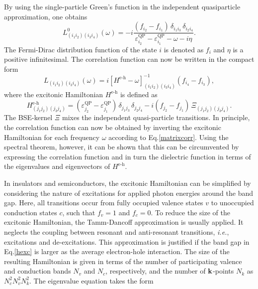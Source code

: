 %
By using the single-particle Green's function in the independent quasiparticle approximation, one obtains
%
\begin{equation}
     L^0_{(i_1i_2)(i_3i_4)}(\omega) = -i\frac{(f_{i_2} - f_{i_1})\,\delta_{i_1i_3}\,\delta_{i_2i_4}}{\varepsilon^\text{QP}_{i_2} - \varepsilon^\text{QP}_{i_1} - \omega - i\eta}.
\end{equation}
%
\newpage
The Fermi-Dirac distribution function of the state $i$ is denoted as $f_i$  and $\eta$ is a positive infinitesimal. The correlation function can now be written in the compact form
%
\begin{equation}
    L_{(i_1i_2)(i_3i_4)}(\omega) = i\left[ H^\text{e-h} - \omega\right]^{-1}_{(i_1i_2)(i_3i_4)}(f_{i_4} - f_{i_3}),
\end{equation}
%
where the excitonic Hamiltonian $ H^\text{e-h}$ is defined as
%
\begin{equation}\label{hexc}
     H^\text{e-h}_{(j_1j_2)(j_3j_4)} = \left(\varepsilon^\text{QP}_{j_2} - \varepsilon^\text{QP}_{j_1}\right)\,\delta_{j_1j_3}\,\delta_{j_2j_4} - i(f_{j_2} - f_{j_1})\,\Xi_{(j_1j_2)(j_3j_4)}.
\end{equation}
%
The BSE-kernel $\Xi$ mixes the independent quasi-particle transitions. In principle, the correlation function can now be obtained by inverting the excitonic Hamiltonian for each frequency $\omega$ according to Eq.\;\eqref{matrixcorr}. Using the spectral theorem, however, it can be shown that this can be circumvented by expressing the correlation function and in turn the dielectric function in terms of the eigenvalues and eigenvectors of $ H^\text{e-h}$.\par
In insulators and semiconductors, the excitonic Hamiltonian can be simplified by considering the nature of excitations for applied photon energies around the band gap. Here, all transitions occur from fully occupied valence states $v$ to unoccupied conduction states $c$, such that $f_v=1$  and $f_c=0$.  To reduce the size of the excitonic Hamiltonian, the Tamm-Dancoff approximation\cite{fetterwalecka} is usually applied. It neglects the coupling between resonant and anti-resonant transitions, \textit{i.e.}, excitations and de-excitations. This approximation is justified if the band gap in Eq.\;\eqref{hexc}  is larger as the average electron-hole interaction\cite{Vorwerk_2019}. The size of the resulting Hamiltonian is given in terms of the number of participating valence and conduction bands $N_v$ and $N_c$,  respectively, and the number of  $\mathbf{k}$-points $N_k$ as $N^2_cN^2_vN^2_k$.  The eigenvalue equation  takes the form 
